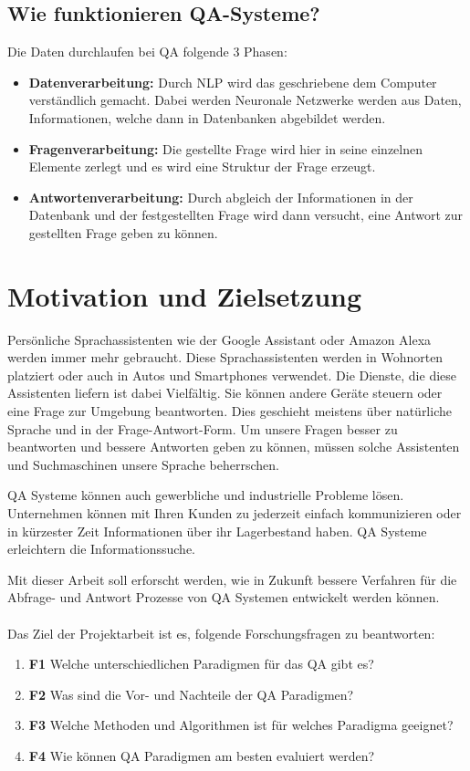 \documentclass[
        ngerman,
        paper=a4,
        numbers=noendperiod,
]{scrreprt}
\begin{document}
\section{Wie funktionieren QA-Systeme?}
Die Daten durchlaufen bei QA folgende 3 Phasen:
\begin{itemize}
\item \textbf{Datenverarbeitung:} Durch NLP wird das geschriebene dem Computer verständlich gemacht. Dabei werden Neuronale Netzwerke werden aus Daten, Informationen, welche dann in Datenbanken abgebildet werden.
\item \textbf{Fragenverarbeitung:} Die gestellte Frage wird hier in seine einzelnen Elemente zerlegt und es wird eine Struktur der Frage erzeugt.
\item \textbf{Antwortenverarbeitung:} Durch abgleich der Informationen in der Datenbank und der festgestellten Frage wird dann versucht, eine Antwort zur gestellten Frage geben zu können.
\end{itemize}


\chapter{Motivation und Zielsetzung}
Persönliche Sprachassistenten wie der Google Assistant oder Amazon Alexa werden immer mehr gebraucht. Diese Sprachassistenten werden in Wohnorten platziert oder auch in Autos und Smartphones verwendet. Die Dienste, die diese Assistenten liefern ist dabei Vielfältig. Sie können andere Geräte steuern oder eine Frage zur Umgebung beantworten. Dies geschieht meistens über natürliche Sprache und in der Frage-Antwort-Form. Um unsere Fragen besser zu beantworten und bessere Antworten geben zu können, müssen solche Assistenten und Suchmaschinen unsere Sprache beherrschen. 

QA Systeme können auch gewerbliche und industrielle Probleme lösen. Unternehmen können mit Ihren Kunden zu jederzeit einfach kommunizieren oder in kürzester Zeit Informationen über ihr Lagerbestand haben. QA Systeme erleichtern die Informationssuche.

Mit dieser Arbeit soll erforscht werden, wie in Zukunft bessere Verfahren für die Abfrage- und Antwort Prozesse von QA Systemen entwickelt werden können.
\\
\\
Das Ziel der Projektarbeit ist es, folgende Forschungsfragen zu beantworten:

 \begin{enumerate}
    \item \textbf{F1} Welche unterschiedlichen Paradigmen für das QA gibt es?
    \item \textbf{F2} Was sind die Vor- und Nachteile der QA Paradigmen?
    \item \textbf{F3} Welche Methoden und Algorithmen ist für welches Paradigma geeignet?
    \item \textbf{F4} Wie können QA Paradigmen am besten evaluiert werden?
  \end{enumerate}
\end{document}
